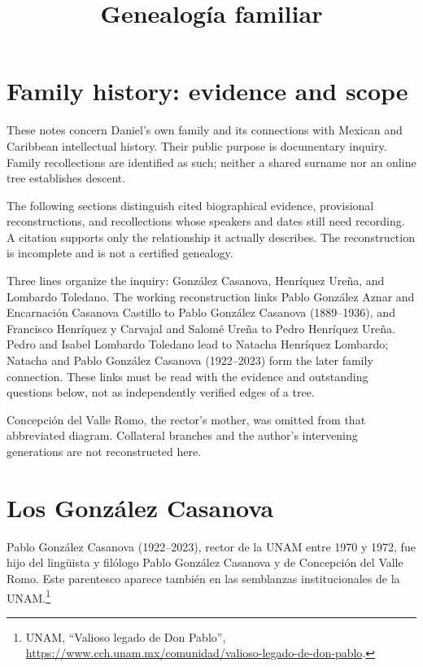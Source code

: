 



\title{Genealogía familiar}
\maketitle

\label{section-phantom}

\tableofcontents

\section{Family history: evidence and scope}
\label{section-genealogia-mapa-general}

These notes concern Daniel's own family and
its connections with Mexican and Caribbean
intellectual history. Their public purpose is
documentary inquiry. Family recollections are
identified as such; neither a shared surname
nor an online tree establishes descent.

The following sections distinguish cited
biographical evidence, provisional
reconstructions, and recollections whose
speakers and dates still need recording. A
citation supports only the relationship it
actually describes. The reconstruction is
incomplete and is not a certified genealogy.

Three lines organize the inquiry: González
Casanova, Henríquez Ureña, and Lombardo
Toledano. The working reconstruction links Pablo
González Aznar and Encarnación Casanova
Castillo to Pablo González Casanova
(1889--1936), and Francisco Henríquez y
Carvajal and Salomé Ureña to Pedro Henríquez
Ureña. Pedro and Isabel Lombardo Toledano
lead to Natacha Henríquez Lombardo; Natacha
and Pablo González Casanova (1922--2023) form
the later family connection. These links must
be read with the evidence and outstanding
questions below, not as independently
verified edges of a tree.

Concepción del Valle Romo, the rector's
mother, was omitted from that abbreviated
diagram. Collateral branches and the author's
intervening generations are not reconstructed
here.

\section{Los González Casanova}
\label{section-genealogia-gonzalez-casanova}

Pablo González Casanova (1922--2023), rector de
la UNAM entre 1970 y 1972, fue hijo del lingüista
y filólogo Pablo González Casanova y de Concepción
del Valle Romo. Este parentesco aparece también en
las semblanzas institucionales de la UNAM.\footnote{%
UNAM, ``Valioso legado de Don Pablo'',
\url{https://www.cch.unam.mx/comunidad/valioso-legado-de-don-pablo}.}


